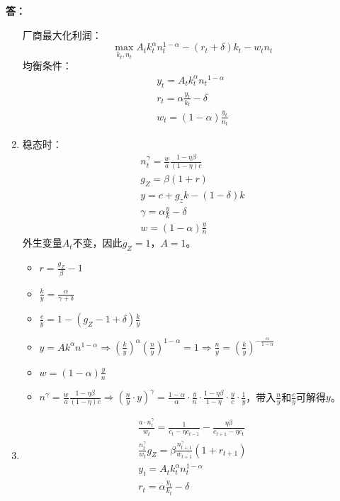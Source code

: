 \documentclass[12pt, a4paper, oneside]{article}
\newcounter{answername}
\newenvironment{answer}{\stepcounter{answername}\par\noindent\textbf{答：}}{\par}
\begin{document}
\begin{CJK*}{UTF8}{gbsn}
\begin{answer}
\begin{enumerate}
\begin{itemize}
			\end{itemize}
			厂商最大化利润：
			$$
			\max_{k_t, n_t} A_{t} k_{t}^{\alpha} n_{t}^{1-\alpha}-\left(r_{t}+\delta\right) k_{t}-w_{t} n_{t}
			$$
			均衡条件：
			$$
			\begin{array}{l}y_{t}=A_{t} k_{t}^{\alpha} n_{t}{ }^{1-\alpha} \\ r_{t}=\alpha \frac{y_{t}}{k_{t}}-\delta \\ w_{t}=(1-\alpha)\frac{y_{t}}{n_{t}}
			\end{array}
			$$
		\item 稳态时：
			$$
			\begin{array}{l}
				n_{t}^{\gamma}=\frac{w}{a} \frac{1-\eta \beta}{(1-\eta)c}
				\\
				g_{Z}=\beta(1+r)
				\\
				y=c+g_{z} k-(1-\delta) k
				\\
				\gamma=\alpha \frac{y}{k}-\delta
				\\
				w=(1-\alpha) \frac{y}{n}
			\end{array}
			$$
			外生变量$A_t$不变，因此$g_Z=1$，$A=1$。
			\begin{itemize}
				\item $r=\frac{g_Z}{\beta}-1$
				\item $\frac{k}{y}=\frac{\alpha}{\gamma+\delta}$
				\item $\frac{c}{y}=1-(g_Z-1+\delta)\frac{k}{y}$
				\item $y=A k^{\alpha} n^{1-\alpha} \Rightarrow(\frac{k}{y})^\alpha(\frac{n}{y})^{1-\alpha}=1\Rightarrow\frac{n}{y}=(\frac{k}{y})^{-\frac{\alpha}{1-\alpha}}$
				\item $w=(1-\alpha)\frac{y}{n}$
				\item $n^{\gamma}=\frac{w}{a}\frac{1-\eta \beta}{(1-\eta)c}\Rightarrow(\frac{n}{y}\cdot y)^\gamma=\frac{1-\alpha}{\alpha}\cdot\frac{y}{n}\cdot\frac{1-\eta\beta}{1-\eta}\cdot\frac{y}{c}\cdot\frac{1}{y}$，带入$\frac{n}{y}$和$\frac{c}{y}$可解得$y$。
			\end{itemize}
		\item $$
			\begin{array}{c}
				\frac{a \cdot n_{t}^{\gamma}}{w_{t}}=\frac{1}{c_{t}-\eta c_{t-1}}-\frac{\eta \beta}{c_{t+1}-\eta c_{t}} 
				\\ \frac{n_{t}^{\gamma}}{w_{t}} g_{Z}=\beta \frac{n_{t+1}^{\gamma}}{w_{t+1}}\left(1+r_{t+1}\right) 
				\\ y_{t}=A_{t} k_{t}^{\alpha} n_{t}^{1-\alpha} 
				\\ r_{t}=\alpha \frac{y_{t}}{k_{t}}-\delta 

\end{array}$$
\end{enumerate}
\end{answer}
\end{CJK*}
\end{document}
